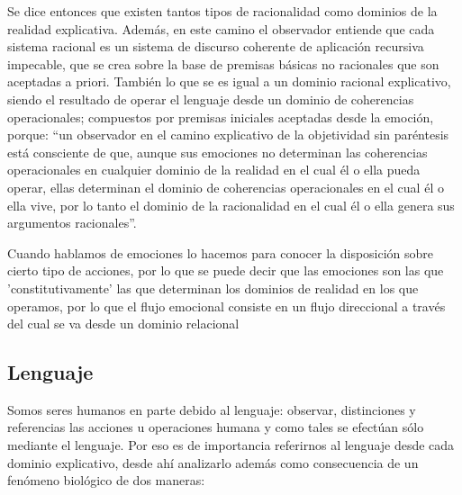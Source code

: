 \documentclass[10pt]{article}
\begin{document}
        Se dice entonces que existen tantos tipos de racionalidad como dominios de la realidad explicativa. Además, en este camino el observador entiende que cada sistema racional es un sistema de discurso coherente de aplicación recursiva impecable, que se crea sobre la base de premisas básicas no racionales que son aceptadas a priori. También lo que se es igual a un dominio racional explicativo, siendo el resultado de operar el lenguaje desde un dominio de coherencias operacionales; compuestos por premisas iniciales aceptadas desde la emoción, porque: “un observador en el camino explicativo de la objetividad sin paréntesis está consciente de que, aunque sus emociones no determinan las coherencias operacionales en cualquier dominio de la realidad en el cual él o ella pueda operar, ellas determinan el dominio de coherencias operacionales en el cual él o ella vive, por lo tanto el dominio de la racionalidad en el cual él o ella genera sus argumentos racionales”.
        
        Cuando hablamos de emociones lo hacemos para conocer la disposición sobre cierto tipo de acciones, por lo que se puede decir que las emociones son las que 'constitutivamente' las que determinan los dominios de realidad en los que operamos, por lo que el flujo emocional consiste en un flujo direccional a través del cual se va desde un dominio relacional

        
        \subsection{Lenguaje}

        Somos seres humanos en parte debido al lenguaje: observar, distinciones y referencias las acciones u operaciones humana y como tales se efectúan sólo mediante el lenguaje. Por eso es de importancia referirnos al lenguaje desde cada dominio explicativo, desde ahí analizarlo además como consecuencia de un fenómeno biológico de dos maneras:
        
\end{document}
